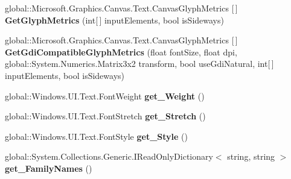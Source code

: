 \begin{DoxyCompactItemize}
\item 
\mbox{\label{interface_microsoft_1_1_graphics_1_1_canvas_1_1_text_1_1_i_canvas_font_face_a287e4336eb4ba744584288150ac1f201}} 
global\+::\+Microsoft.\+Graphics.\+Canvas.\+Text.\+Canvas\+Glyph\+Metrics \mbox{[}$\,$\mbox{]} {\bfseries Get\+Glyph\+Metrics} (int\mbox{[}$\,$\mbox{]} input\+Elements, bool is\+Sideways)
\item 
\mbox{\label{interface_microsoft_1_1_graphics_1_1_canvas_1_1_text_1_1_i_canvas_font_face_a4e5a33ee705a9c9fc505d35ceddca4fc}} 
global\+::\+Microsoft.\+Graphics.\+Canvas.\+Text.\+Canvas\+Glyph\+Metrics \mbox{[}$\,$\mbox{]} {\bfseries Get\+Gdi\+Compatible\+Glyph\+Metrics} (float font\+Size, float dpi, global\+::\+System.\+Numerics.\+Matrix3x2 transform, bool use\+Gdi\+Natural, int\mbox{[}$\,$\mbox{]} input\+Elements, bool is\+Sideways)
\item 
\mbox{\label{interface_microsoft_1_1_graphics_1_1_canvas_1_1_text_1_1_i_canvas_font_face_ad97d3d431367976150ce2a63ff9246e9}} 
global\+::\+Windows.\+U\+I.\+Text.\+Font\+Weight {\bfseries get\+\_\+\+Weight} ()
\item 
\mbox{\label{interface_microsoft_1_1_graphics_1_1_canvas_1_1_text_1_1_i_canvas_font_face_a9caa5dbc136e73f4f101f68caf4998a9}} 
global\+::\+Windows.\+U\+I.\+Text.\+Font\+Stretch {\bfseries get\+\_\+\+Stretch} ()
\item 
\mbox{\label{interface_microsoft_1_1_graphics_1_1_canvas_1_1_text_1_1_i_canvas_font_face_ade1356d4fa0f617d15664aeed9c5f1a3}} 
global\+::\+Windows.\+U\+I.\+Text.\+Font\+Style {\bfseries get\+\_\+\+Style} ()
\item 
\mbox{\label{interface_microsoft_1_1_graphics_1_1_canvas_1_1_text_1_1_i_canvas_font_face_a73f0fb8007a55fff8060acaf2333c43c}} 
global\+::\+System.\+Collections.\+Generic.\+I\+Read\+Only\+Dictionary$<$ string, string $>$ {\bfseries get\+\_\+\+Family\+Names} ()

\end{DoxyCompactItemize}
